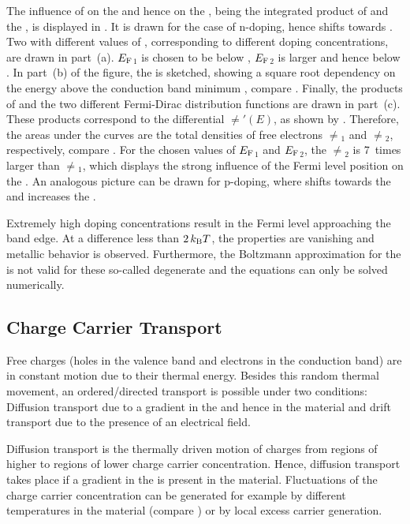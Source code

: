 %
The influence of \Ef on the \fFDLong \fFD and hence on the \neLong \ne, being the integrated product of \fFD and the \dosLong \dos, is displayed in . It is drawn for the case of n-doping, hence \Ef shifts towards \Ec.
Two  with different values of \Ef, corresponding to different doping concentrations, are drawn in part~(a). $E_\text{F}${}$_1$ is chosen to be  below \Ec, $E_\text{F}${}$_2$ is  larger and hence  below \Ec.
In part~(b) of the figure, the \dos is sketched, showing a square root dependency on the energy above the conduction band minimum \Ec, compare . Finally, the products of \dosLong and the two different Fermi-Dirac distribution functions are drawn in part~(c). These products correspond to the differential \neLong $\ne'(E)$, as shown by . Therefore, the areas under the curves are the total densities of free electrons $\ne${}$_1$ and $\ne${}$_2$, respectively, compare .
For the chosen values of $E_\text{F}${}$_1$ and $E_\text{F}${}$_2$, the \neLong $\ne${}$_2$ is 7~times larger than $\ne${}$_1$, which displays the strong influence of the Fermi level position on the \neLong.
An analogous picture can be drawn for p-doping, where \Ef shifts towards the \Ev and increases the \nhLong \nh.

Extremely high doping concentrations result in the Fermi level approaching the band edge. At a difference less than $2\,k_\text{B}T$, the \SC properties are vanishing and metallic behavior is observed. Furthermore, the Boltzmann approximation for the \fFDLong is not valid for these so-called degenerate \SCs and the equations can only be solved numerically.

\subsection{Charge Carrier Transport}\label{sec:TheoDiffusionCurrent}\label{sec:TheoDriftCurrent}
Free charges (holes in the valence band and electrons in the conduction band) are in constant motion due to their thermal energy. Besides this random thermal movement, an ordered/directed transport is possible under two conditions: Diffusion transport due to a gradient in the \nLong and hence \Ef in the material and drift transport due to the presence of an electrical field. %

Diffusion transport is the thermally driven motion of charges from regions of higher to regions of lower charge carrier concentration. Hence, diffusion transport takes place if a gradient in the \nLong is present in the material.
Fluctuations of the charge carrier concentration can be generated for example by different temperatures in the material (compare ) or by local excess carrier generation.

